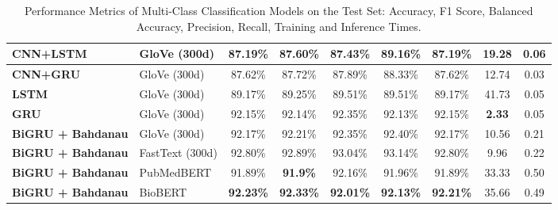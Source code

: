 \documentclass[12pt]{report}
\begin{document}
\begin{table}[H]
{\begin{tabular}{|l|l|c|c|c|c|c|c|c|}
\textbf{CNN+LSTM}           & GloVe (300d)              & 87.19\%           & 87.60\%           & 87.43\%              & 89.16\%            & 87.19\%         & 19.28                    & 0.06                         \\ \hline
\textbf{CNN+GRU}            & GloVe (300d)              & 87.62\%           & 87.72\%           & 87.89\%              & 88.33\%            & 87.62\%         & 12.74                    & 0.03                         \\ \hline
\textbf{LSTM}               & GloVe (300d)              & 89.17\%           & 89.25\%           & 89.51\%              & 89.51\%            & 89.17\%         & 41.73                    & 0.05                         \\ \hline
\textbf{GRU}                & GloVe (300d)              & 92.15\%           & 92.14\%           & 92.35\%              & 92.13\%            & 92.15\%         & \textbf{2.33}                     & 0.05                         \\ \hline
\textbf{BiGRU + Bahdanau}   & GloVe (300d)              & 92.17\%           & 92.21\%           & 92.35\%              & 92.40\%            & 92.17\%         & 10.56                    & 0.21                         \\ \hline
\textbf{BiGRU + Bahdanau}   & FastText (300d)           & 92.80\%           & 92.89\%           & 93.04\%              & 93.14\%            & 92.80\%         & 9.96                     & 0.22                         \\ \hline
\textbf{BiGRU + Bahdanau}   & PubMedBERT                & 91.89\%           & \textbf{91.9\%}  & 92.16\%    & 91.96\% & 91.89\% & 33.33                    & 0.50                         \\ \hline
\textbf{BiGRU + Bahdanau}   & BioBERT                   & \textbf{92.23\%}  & \textbf{92.33\%}          & \textbf{92.01\%}             & \textbf{92.13\%}            & \textbf{92.21\%}         & 35.66                    & 0.49                         \\ \hline
\end{tabular}
}
\caption{Performance Metrics of Multi-Class Classification Models on the Test Set: Accuracy, F1 Score, Balanced Accuracy, Precision, Recall, Training and Inference Times.}
\label{tab:model_performance_multiclass}
\end{table}
\end{document}
